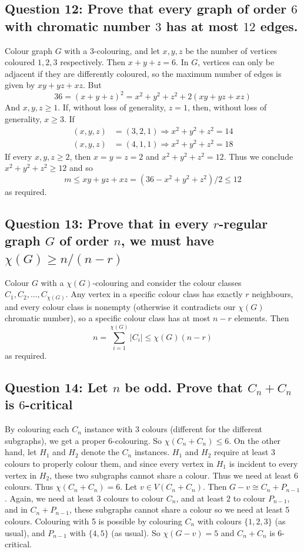 \documentclass[letterpaper, 11pt]{article}
\newcommand{\1}{\mathds{1}}	%
\theoremstyle{definition}
\begin{document}
\subsection*{Question 12: Prove that every graph of order $6$ with chromatic number $3$ has at most $12$ edges.}
Colour graph $G$ with a $3$-colouring, and let $x,y,z$ be the number of vertices coloured $1,2,3$ respectively. Then $x+y+z=6$. In $G$, vertices can only be adjacent if they are differently coloured, so the maximum number of edges is given by $xy + yz + xz$. But \[
36 = (x+y+z)^2 = x^2+y^2+z^2 + 2(xy+yz+xz)
\]
And $x,y,z\ge 1$. If, without loss of generality, $z=1$, then, without loss of generality, $x \ge 3$. If \begin{align*}
(x,y,z) & = (3,2,1) \Rightarrow x^2 + y^2 + z^2 = 14 \\ 
(x,y,z) & = (4,1,1) \Rightarrow x^2 + y^2 + z^2 = 18 
\end{align*}
If every $x,y,z \ge 2$, then $x=y=z=2$ and $x^2+y^2+z^2 = 12$. Thus we conclude $x^2+y^2+z^2 \ge 12$ and so \[
m \le xy + yz + xz = (36 - x^2+y^2+z^2)/2 \le 12
\]
as required.

\subsection*{Question 13: Prove that in every $r$-regular graph $G$ of order $n$, we must have $\chi (G) \ge n/(n-r)$}
Colour $G$ with a $\chi(G)$-colouring and consider the colour classes $C_1,C_2,...,C_{\chi(G)}$. Any vertex in a specific colour class has exactly $r$ neighbours, and every colour class is nonempty (otherwise it contradicts our $\chi (G)$ chromatic number), so a specific colour class has at most $n-r$ elements. Then \[
n = \sum \limits _{i=1}^{\chi (G)} |C_i| \le \chi (G) (n-r)
\]
as required.

\subsection*{Question 14: Let $n$ be odd. Prove that $C_n + C_n$ is $6$-critical}
By colouring each $C_n$ instance with 3 colours (different for the different subgraphs), we get a proper $6$-colouring. So $\chi (C_n + C_n) \le 6$. On the other hand, let $H_1$ and $H_2$ denote the $C_n$ instances. $H_1$ and $H_2$ require at least 3 colours to properly colour them, and since every vertex in $H_1$ is incident to every vertex in $H_2$, these two subgraphs cannot share a colour. Thus we need at least 6 colours. Thus $\chi (C_n + C_n) = 6$. Let $v \in V(C_n + C_n)$. Then $G - v \cong C_n + P_{n-1}$. Again, we need at least 3 colours to colour $C_n$, and at least $2$ to colour $P_{n-1}$, and in $C_n + P_{n-1}$, these subgraphs cannot share a colour so we need at least 5 colours. Colouring with 5 is possible by colouring $C_n$ with colours $\{1,2,3\}$ (as usual), and $P_{n-1}$ with $\{4,5\}$ (as usual). So $\chi (G - v) = 5$ and $C_n + C_n$ is $6$-critical.
\end{document}
